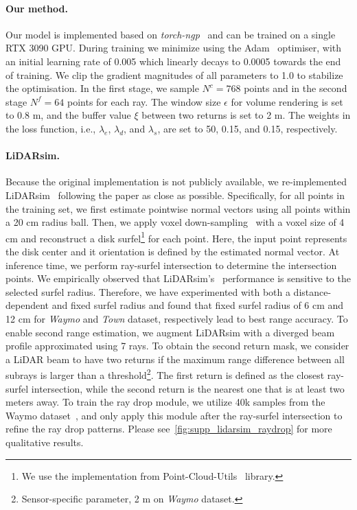 \paragraph{Our method.}
Our model is implemented based on \emph{torch-ngp}~\cite{torch-ngp,muller2022instant} and can be trained on a single RTX 3090 GPU. During training we minimize  using the Adam~\cite{kingma2014adam} optimiser, with an initial learning rate of 0.005 which linearly decays to 0.0005 towards the end of training. We clip the gradient magnitudes of all parameters to 1.0 to stabilize the optimisation. In the first stage, we sample $N^c = 768$ points and in the second stage $N^f=64$ points for each ray. The window size $\epsilon$ for volume rendering is set to 0.8 m, and the buffer value $\xi$ between two returns is set to 2 m. The weights in the loss function, i.e., $\lambda_e$, $\lambda_d$, and $\lambda_s$, are set to 50, 0.15, and 0.15, respectively.



\paragraph{LiDARsim.}
Because the original implementation is not publicly available, we re-implemented LiDARsim~\cite{manivasagam2020lidarsim} following the paper as close as possible. Specifically, for all points in the training set, we first estimate pointwise normal vectors using all points within a 20 cm radius ball. Then, we apply voxel down-sampling~\cite{tang2022torchsparse} with a voxel size of 4 cm and reconstruct a disk surfel\footnote{We use the implementation from Point-Cloud-Utils~\cite{point-cloud-utils} library.} for each point. Here, the input point represents the disk center and it orientation is defined by the estimated normal vector. At inference time, we perform ray-surfel intersection to determine the intersection points. We empirically observed that LiDARsim's~\cite{manivasagam2020lidarsim} performance is sensitive to the selected surfel radius. Therefore, we have experimented with both a distance-dependent and fixed surfel radius and found that fixed surfel radius of 6 cm and 12 cm for \textit{Waymo} and \textit{Town} dataset, respectively lead to best range accuracy. To enable second range estimation, we augment LiDARsim with a diverged beam profile approximated using 7 rays. To obtain the second return mask, we consider a LiDAR beam to have two returns if the maximum range difference between all subrays is larger than a threshold\footnote{Sensor-specific parameter, 2 m on \textit{Waymo} dataset.}. The first return is defined as the closest ray-surfel intersection, while the second return is the nearest one that is at least two meters away. To train the ray drop module, we utilize 40k samples from the Waymo dataset~\cite{sun2020scalability}, and only apply this module after the ray-surfel intersection to refine the ray drop patterns. Please see~\cref{fig:supp_lidarsim_raydrop} for more qualitative results. 


